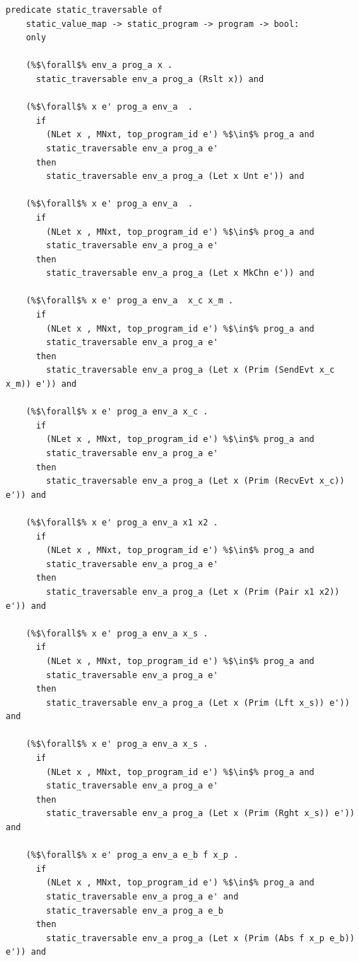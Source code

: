 \documentclass{article}
\begin{document}
\begin{lstlisting}[language=logic, escapechar=\%]
  predicate static_traversable of
    static_value_map -> static_program -> program -> bool:
    only

    (%$\forall$% env_a prog_a x .
      static_traversable env_a prog_a (Rslt x)) and

    (%$\forall$% x e' prog_a env_a  .
      if
        (NLet x , MNxt, top_program_id e') %$\in$% prog_a and
        static_traversable env_a prog_a e'
      then
        static_traversable env_a prog_a (Let x Unt e')) and

    (%$\forall$% x e' prog_a env_a  .
      if
        (NLet x , MNxt, top_program_id e') %$\in$% prog_a and
        static_traversable env_a prog_a e'
      then
        static_traversable env_a prog_a (Let x MkChn e')) and

    (%$\forall$% x e' prog_a env_a  x_c x_m .
      if
        (NLet x , MNxt, top_program_id e') %$\in$% prog_a and
        static_traversable env_a prog_a e'
      then
        static_traversable env_a prog_a (Let x (Prim (SendEvt x_c x_m)) e')) and

    (%$\forall$% x e' prog_a env_a x_c .
      if
        (NLet x , MNxt, top_program_id e') %$\in$% prog_a and
        static_traversable env_a prog_a e'
      then
        static_traversable env_a prog_a (Let x (Prim (RecvEvt x_c)) e')) and

    (%$\forall$% x e' prog_a env_a x1 x2 .
      if
        (NLet x , MNxt, top_program_id e') %$\in$% prog_a and
        static_traversable env_a prog_a e'
      then
        static_traversable env_a prog_a (Let x (Prim (Pair x1 x2)) e')) and

    (%$\forall$% x e' prog_a env_a x_s .
      if
        (NLet x , MNxt, top_program_id e') %$\in$% prog_a and
        static_traversable env_a prog_a e'
      then
        static_traversable env_a prog_a (Let x (Prim (Lft x_s)) e')) and

    (%$\forall$% x e' prog_a env_a x_s .
      if
        (NLet x , MNxt, top_program_id e') %$\in$% prog_a and
        static_traversable env_a prog_a e'
      then
        static_traversable env_a prog_a (Let x (Prim (Rght x_s)) e')) and

    (%$\forall$% x e' prog_a env_a e_b f x_p .
      if
        (NLet x , MNxt, top_program_id e') %$\in$% prog_a and
        static_traversable env_a prog_a e' and
        static_traversable env_a prog_a e_b
      then
        static_traversable env_a prog_a (Let x (Prim (Abs f x_p e_b)) e')) and


\end{lstlisting}
\end{document}
